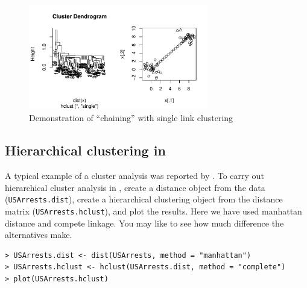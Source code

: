 \begin{figure}
\begin{center}
\includegraphics[width = 0.7\textwidth]{images/chaining}
\caption{Demonstration of ``chaining'' with single link clustering}
\label{chaining}
\end{center}
\end{figure}


\subsection{Hierarchical clustering in \R}

A typical example of a cluster analysis was reported by \cite{Jolliffe+etal:1986}. To carry out hierarchical cluster analysis in \R, create a distance object from the data (\verb+USArrests.dist+), create a hierarchical clustering object from the distance matrix (\verb+USArrests.hclust+), and plot the results.   Here we have used manhattan distance and compete linkage.  You may like to see how much difference the alternatives make.

\singlespacing
\begin{verbatim}
> USArrests.dist <- dist(USArrests, method = "manhattan")
> USArrests.hclust <- hclust(USArrests.dist, method = "complete")
> plot(USArrests.hclust)
\end{verbatim}
\onehalfspacing


